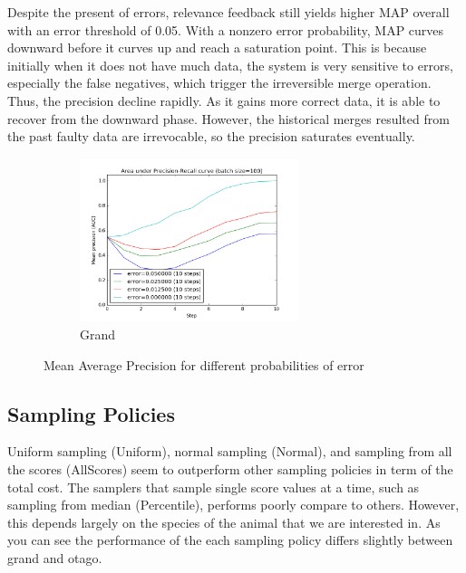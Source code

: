 Despite the present of errors, relevance feedback still yields higher MAP
overall with an error threshold of 0.05. With a nonzero error probability, MAP
curves downward before it curves up and reach a saturation point. This is
because initially when it does not have much data, the system is very sensitive
to errors, especially the false negatives, which trigger the irreversible merge
operation. Thus, the precision decline rapidly.  As it gains more correct data,
it is able to recover from the downward phase. However, the historical merges
resulted from the past faulty data are irrevocable, so the precision saturates
eventually.

\begin{figure}[htb]
  \centering
  \begin{subfigure}[t]{\textwidth}
      \centering
      \includegraphics[width=0.7\textwidth]{errors/graoc}
      \caption{Grand}
  \end{subfigure}%
  \caption{Mean Average Precision for different probabilities of error}
  \label{fig:errors_aoc} %
\end{figure}

\subsection{Sampling Policies} %
\label{sub:sampling_policies_res}

Uniform sampling (Uniform), normal sampling (Normal), and sampling from all the
scores (AllScores) seem to outperform other sampling policies in term of the
total cost. The samplers that sample single score values at a time, such as
sampling from median (Percentile), performs poorly compare to others. However,
this depends largely on the species of the animal that we are interested in. As
you can see the performance of the each sampling policy differs slightly
between grand and otago.

